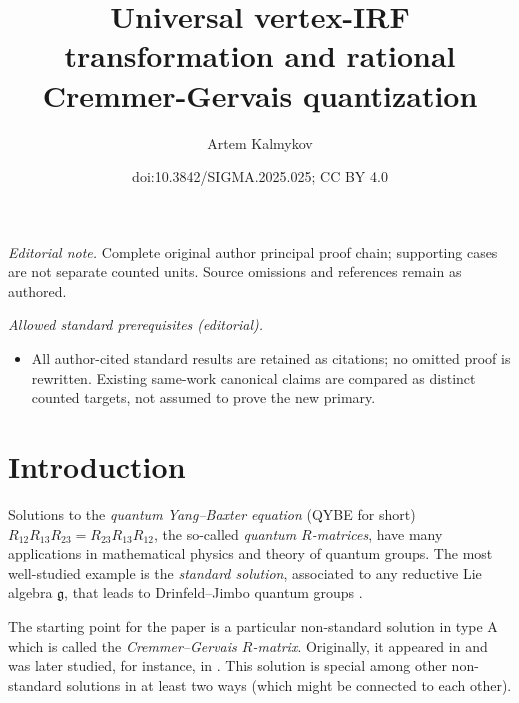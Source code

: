 \documentclass[10pt,a4paper]{article}
\title{Universal vertex-IRF transformation and rational Cremmer-Gervais quantization}
\author{Artem Kalmykov}
\date{doi:10.3842/SIGMA.2025.025; CC BY 4.0}
\numberwithin{equation}{section}
\newcommand{\g}{\mathfrak{g}}
\begin{document}
\maketitle
\noindent\textit{Editorial note.} Complete original author principal proof chain; supporting cases are not separate counted units. Source omissions and references remain as authored.\par\medskip
\noindent\textit{Allowed standard prerequisites (editorial).}\begin{itemize}
\item All author-cited standard results are retained as citations; no omitted proof is rewritten. Existing same-work canonical claims are compared as distinct counted targets, not assumed to prove the new primary.
\end{itemize}\medskip
\section{Introduction}
	
Solutions to the \emph{quantum Yang--Baxter equation} (QYBE for short)
$R_{12} R_{13} R_{23} = R_{23} R_{13} R_{12}$,
	the so-called \emph{quantum $R$-matrices}, have many applications in mathematical physics and theory of quantum groups. The most well-studied example is the \emph{standard solution}, associated to any reductive Lie algebra $\g$, that leads to Drinfeld--Jimbo quantum groups \cite{DrinfeldICM,Jimbo}.
	
The starting point for the paper is a particular non-standard solution in type A which is called the \emph{Cremmer--Gervais $R$-matrix}. Originally, it appeared in \cite{CremmerGervais} and was later studied, for instance, in \cite{BuffenoirRocheTerras,Hodges}. This solution is special among other non-standard solutions in at least two ways (which might be connected to each other).
	
\end{document}

